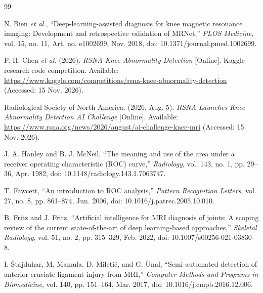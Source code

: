 \cleardoublepage
{}
{}
\renewcommand{\bibname}{REFERENCES}
\begingroup
\setlength{\itemsep}{2pt}
\begin{thebibliography}{99}
\sloppy\raggedright

 N. Bien \textit{et al.}, ``Deep-learning-assisted diagnosis for knee magnetic resonance imaging: Development and retrospective validation of MRNet,'' \textit{PLOS Medicine}, vol. 15, no. 11, Art. no. e1002699, Nov. 2018, doi: 10.1371/journal.pmed.1002699.

 P.-H. Chen \textit{et al.} (2026). \textit{RSNA Knee Abnormality Detection} [Online]. Kaggle research code competition. Available: \url{https://www.kaggle.com/competitions/rsna-knee-abnormality-detection} (Accessed: 15 Nov. 2026).

 Radiological Society of North America. (2026, Aug. 5). \textit{RSNA Launches Knee Abnormality Detection AI Challenge} [Online]. Available: \url{https://www.rsna.org/news/2026/august/ai-challenge-knee-mri} (Accessed: 15 Nov. 2026).

 J. A. Hanley and B. J. McNeil, ``The meaning and use of the area under a receiver operating characteristic (ROC) curve,'' \textit{Radiology}, vol. 143, no. 1, pp. 29--36, Apr. 1982, doi: 10.1148/radiology.143.1.7063747.

 T. Fawcett, ``An introduction to ROC analysis,'' \textit{Pattern Recognition Letters}, vol. 27, no. 8, pp. 861--874, Jun. 2006, doi: 10.1016/j.patrec.2005.10.010.

 B. Fritz and J. Fritz, ``Artificial intelligence for MRI diagnosis of joints: A scoping review of the current state-of-the-art of deep learning-based approaches,'' \textit{Skeletal Radiology}, vol. 51, no. 2, pp. 315--329, Feb. 2022, doi: 10.1007/s00256-021-03830-8.

 I. \v{S}tajduhar, M. Mamula, D. Mileti\'{c}, and G. \"{U}nal, ``Semi-automated detection of anterior cruciate ligament injury from MRI,'' \textit{Computer Methods and Programs in Biomedicine}, vol. 140, pp. 151--164, Mar. 2017, doi: 10.1016/j.cmpb.2016.12.006.


\end{thebibliography}
